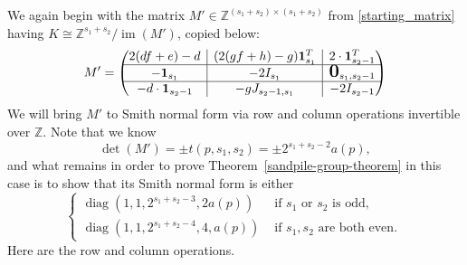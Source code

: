 \documentclass[10pt,reqno]{amsart}
\newcommand{\bigzero}{\mbox{\normalfont\Large\bfseries 0}}
\newcommand{\rvline}{\hspace*{-\arraycolsep}\vline\hspace*{-\arraycolsep}}
\newcommand{\Z}{\mathbb{Z}}
\DeclareMathOperator{\im}{im}
\DeclareMathOperator{\diag}{diag}
\def\onesvector{\mathbf{1}}
\begin{document}
\noindent
We again begin with the matrix $M' \in \Z^{(s_1+s_2) \times (s_1+s_2)}$ from \eqref{starting_matrix} having $K \cong \Z^{s_1+s_2}/\im(M')$, copied below:
\begin{equation*}
M'=\begin{pmatrix}
2(df+e)-d & \rvline & (2(gf+h)-g)\onesvector^T_{s_1} & \rvline & 2\cdot\onesvector^T_{s_2-1} \\
\hline
-\onesvector_{s_1} & \rvline & -2I_{s_1} & \rvline & \bigzero_{s_1,s_2-1} \\
\hline
-d \cdot \onesvector_{s_2-1} & \rvline & -g J_{s_2-1,s_1} & \rvline & -2 I_{s_2-1} 
\end{pmatrix}
\end{equation*}
We will bring $M'$ to Smith normal form via
row and column operations invertible over $\Z$.
Note that we know
$$
\det(M')=\pm t(p,s_1,s_2)=\pm 2^{s_1+s_2-2} a(p),
$$
and what remains in order to prove Theorem~\ref{sandpile-group-theorem} in this case is to show that its Smith normal form is either
$$
\begin{cases}
  \diag(1,1,2^{s_1+s_2-3},2a(p)) & \text{ if }s_1\text{ or }s_2\text{ is odd},\\  
  \diag(1,1,2^{s_1+s_2-4},4,a(p)) & \text{ if }s_1,s_2\text{ are both even}.\
\end{cases}
$$
Here are the row and column operations.
\end{document}
